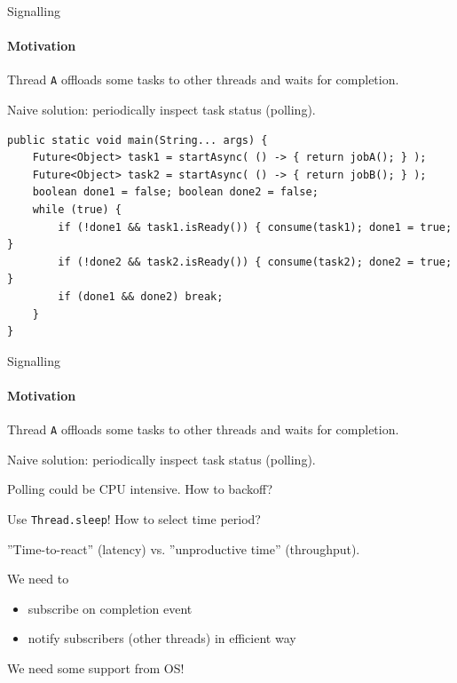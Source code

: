 \begin{frame}[t,fragile]{Signalling}
\framesubtitle{Motivation}

Thread \texttt{A} offloads some tasks to other threads and waits for completion.

\pause 

Naive solution: periodically inspect task status (polling).

\begin{verbatim}
public static void main(String... args) {
    Future<Object> task1 = startAsync( () -> { return jobA(); } );
    Future<Object> task2 = startAsync( () -> { return jobB(); } );
    boolean done1 = false; boolean done2 = false;
    while (true) {
        if (!done1 && task1.isReady()) { consume(task1); done1 = true; }
        if (!done2 && task2.isReady()) { consume(task2); done2 = true; }
        if (done1 && done2) break;
    }
}
\end{verbatim}
\end{frame}


\begin{frame}{Signalling}
\framesubtitle{Motivation}

Thread \texttt{A} offloads some tasks to other threads and waits for completion.

Naive solution: periodically inspect task status (polling).

Polling could be CPU intensive. How to backoff?

\pause

Use \texttt{Thread.sleep}! How to select time period?

\pause

''Time-to-react'' (latency) vs. ''unproductive time'' (throughput).

\pause
We need to
\begin{itemize}
 \item subscribe on completion event
 \item notify subscribers (other threads) in efficient way
\end{itemize}

We need some support from OS!
\end{frame}


